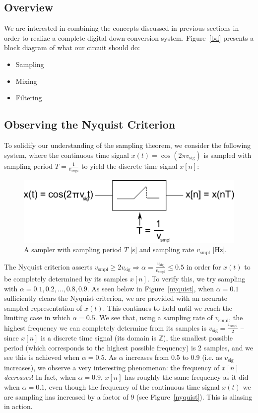 \documentclass[11pt]{article}
\begin{document}
    \subsection{Overview}
    We are interested in combining the concepts discussed in previous sections in order to realize a complete digital down-conversion system. Figure~\ref{bd} presents a block diagram of what our circuit should do:
    \begin{itemize}
        \item Sampling
        \item Mixing
        \item Filtering
    \end{itemize}

    \subsection{Observing the Nyquist Criterion}
    To solidify our understanding of the sampling theorem, we consider the following system, where the continuous time signal $x(t) = \cos(2\pi v_{\text{sig}})$ is sampled with sampling period $T = \frac{1}{v_{\text{smpl}}}$ to yield the discrete time signal $x[n]$:
    \begin{figure}[H]
        \centering
            \includegraphics[width = \textwidth]{sampler.pdf}
        \caption{A sampler with sampling period $T$ [s] and sampling rate $v_{\text{smpl}}$ [Hz].}
    \end{figure}
    \noindent The Nyquist criterion asserts $v_{\text{smpl}} \geq 2v_{\text{sig}} \Rightarrow \alpha = \frac{v_{\text{sig}}}{v_{\text{smpl}}} \leq 0.5$ in order for $x(t)$ to be completely determined by its samples $x[n]$. To verify this, we try sampling with $\alpha = 0.1, 0.2, \dotsc, 0.8, 0.9$. As seen below in Figure~\ref{nyquist}, when $\alpha = 0.1$ sufficiently clears the Nyquist criterion, we are provided with an accurate sampled representation of $x(t)$. This continues to hold until we reach the limiting case in which $\alpha = 0.5$. We see that, using a sampling rate of $v_{\text{smpl}}$, the highest frequency we can completely determine from its samples is $v_{\text{sig}} = \frac{v_{\text{smpl}}}{2}$ -- since $x[n]$ is a discrete time signal (its domain is $\mathbb{Z}$), the smallest possible period (which corresponds to the highest possible frequency) is 2 samples, and we see this is achieved when $\alpha = 0.5$. As $\alpha$ increases from 0.5 to 0.9 (i.e. as $v_{\text{sig}}$ increases), we observe a very interesting phenomenon: the frequency of $x[n]$ \emph{decreases}! In fact, when $\alpha = 0.9$, $x[n]$ has roughly the same frequency as it did when $\alpha = 0.1$, even though the frequency of the continuous time signal $x(t)$ we are sampling has increased by a factor of 9 (see Figure~\ref{nyquist}). This is aliasing in action.
\end{document}
